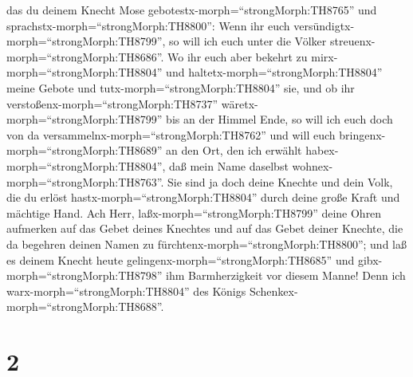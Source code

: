 das du deinem Knecht Mose gebotestx-morph=``strongMorph:TH8765'' und
sprachstx-morph=``strongMorph:TH8800'': Wenn ihr euch
versündigtx-morph=``strongMorph:TH8799'', so will ich euch unter die
Völker streuenx-morph=``strongMorph:TH8686''.  Wo ihr euch
aber bekehrt zu mirx-morph=``strongMorph:TH8804'' und
haltetx-morph=``strongMorph:TH8804'' meine Gebote und
tutx-morph=``strongMorph:TH8804'' sie, und ob ihr
verstoßenx-morph=``strongMorph:TH8737''
wäretx-morph=``strongMorph:TH8799'' bis an der Himmel Ende, so will ich
euch doch von da versammelnx-morph=``strongMorph:TH8762'' und will euch
bringenx-morph=``strongMorph:TH8689'' an den Ort, den ich erwählt
habex-morph=``strongMorph:TH8804'', daß mein Name daselbst
wohnex-morph=``strongMorph:TH8763''.  Sie sind ja doch
deine Knechte und dein Volk, die du erlöst
hastx-morph=``strongMorph:TH8804'' durch deine große Kraft und mächtige
Hand.  Ach Herr, laßx-morph=``strongMorph:TH8799'' deine
Ohren aufmerken auf das Gebet deines Knechtes und auf das Gebet deiner
Knechte, die da begehren deinen Namen zu
fürchtenx-morph=``strongMorph:TH8800''; und laß es deinem Knecht heute
gelingenx-morph=``strongMorph:TH8685'' und
gibx-morph=``strongMorph:TH8798'' ihm Barmherzigkeit vor diesem Manne!
Denn ich warx-morph=``strongMorph:TH8804'' des Königs
Schenkex-morph=``strongMorph:TH8688''.

\hypertarget{section-1}{%
\section{2}\label{section-1}}

